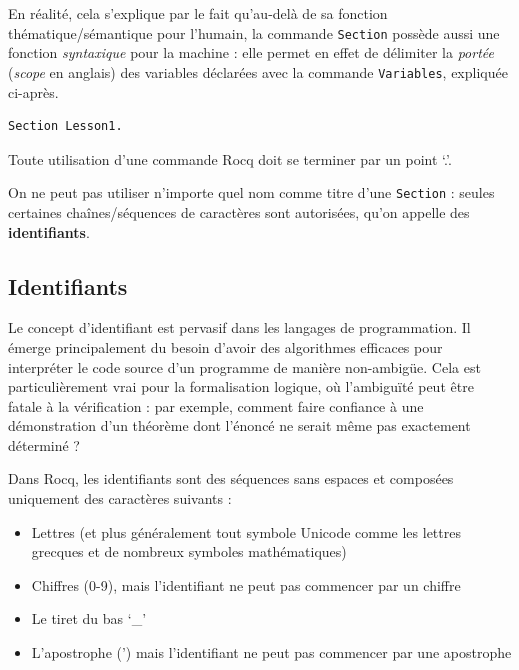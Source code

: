 \documentclass[11pt,a4paper]{article}
\begin{document}
En réalité, cela s'explique par le fait qu'au-delà de sa fonction thématique/sémantique pour l'humain, la commande \texttt{Section} possède aussi une fonction \emph{syntaxique} pour la machine : elle permet en effet de délimiter la \emph{portée} (\emph{scope} en anglais) des variables déclarées avec la commande \texttt{Variables}, expliquée ci-après.

\begin{lstlisting}
Section Lesson1.
\end{lstlisting}

\begin{remarque}{}{}
  Toute utilisation d'une commande Rocq doit se terminer par un point `.'.
\end{remarque}

\begin{remarque}{}{}
  On ne peut pas utiliser n'importe quel nom comme titre d'une \texttt{Section} : seules certaines chaînes/séquences de caractères sont autorisées, qu'on appelle des \textbf{identifiants}.
\end{remarque}

\subsection*{Identifiants}

Le concept d'identifiant est pervasif dans les langages de programmation. Il émerge principalement du besoin d'avoir des algorithmes efficaces pour interpréter le code source d'un programme de manière non-ambigüe. Cela est particulièrement vrai pour la formalisation logique, où l'ambiguïté peut être fatale à la vérification : par exemple, comment faire confiance à une démonstration d'un théorème dont l'énoncé ne serait même pas exactement déterminé ?

Dans Rocq, les identifiants sont des séquences sans espaces et composées uniquement des caractères suivants :
\begin{itemize}
  \item Lettres (et plus généralement tout symbole Unicode comme les lettres grecques et de nombreux symboles mathématiques)
  \item Chiffres (0-9), mais l'identifiant ne peut pas commencer par un chiffre
  \item Le tiret du bas `\_'
  \item L'apostrophe (') mais l'identifiant ne peut pas commencer par une apostrophe
\end{itemize}
\end{document}
